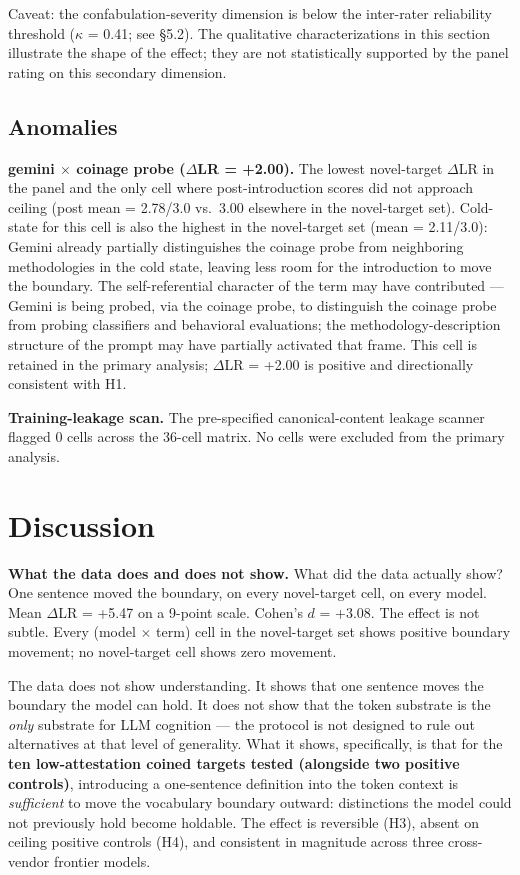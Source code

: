 \documentclass[11pt,a4paper]{article}
\begin{document}
Caveat: the confabulation-severity dimension is below the inter-rater reliability threshold ($\kappa$ = 0.41; see \S5.2). The qualitative characterizations in this section illustrate the shape of the effect; they are not statistically supported by the panel rating on this secondary dimension.

\subsection{Anomalies}

\textbf{gemini $\times$ coinage probe ($\Delta$LR = +2.00).} The lowest novel-target $\Delta$LR in the panel and the only cell where post-introduction scores did not approach ceiling (post mean = 2.78/3.0 vs.\ 3.00 elsewhere in the novel-target set). Cold-state for this cell is also the highest in the novel-target set (mean = 2.11/3.0): Gemini already partially distinguishes the coinage probe from neighboring methodologies in the cold state, leaving less room for the introduction to move the boundary. The self-referential character of the term may have contributed --- Gemini is being probed, via the coinage probe, to distinguish the coinage probe from probing classifiers and behavioral evaluations; the methodology-description structure of the prompt may have partially activated that frame. This cell is retained in the primary analysis; $\Delta$LR = +2.00 is positive and directionally consistent with H1.

\textbf{Training-leakage scan.} The pre-specified canonical-content leakage scanner flagged 0 cells across the 36-cell matrix. No cells were excluded from the primary analysis.

\section{Discussion}

\textbf{What the data does and does not show.} What did the data actually show? One sentence moved the boundary, on every novel-target cell, on every model. Mean $\Delta$LR = +5.47 on a 9-point scale. Cohen's $d$ = +3.08. The effect is not subtle. Every (model $\times$ term) cell in the novel-target set shows positive boundary movement; no novel-target cell shows zero movement.

The data does not show understanding. It shows that one sentence moves the boundary the model can hold. It does not show that the token substrate is the \textit{only} substrate for LLM cognition --- the protocol is not designed to rule out alternatives at that level of generality. What it shows, specifically, is that for the \textbf{ten low-attestation coined targets tested (alongside two positive controls)}, introducing a one-sentence definition into the token context is \textit{sufficient} to move the vocabulary boundary outward: distinctions the model could not previously hold become holdable. The effect is reversible (H3), absent on ceiling positive controls (H4), and consistent in magnitude across three cross-vendor frontier models.
\end{document}
